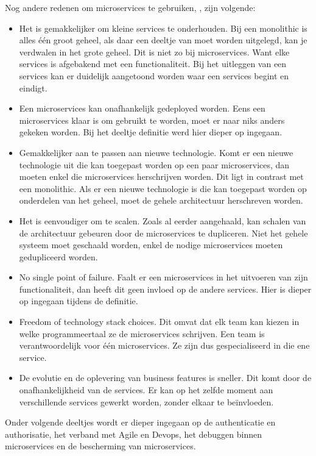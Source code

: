 Nog andere redenen om microservices te gebruiken, \textcite{Koukia2018}, zijn volgende:
\begin{itemize}
	\item Het is gemakkelijker om kleine services te onderhouden. Bij een monolithic is alles één groot geheel, als daar een deeltje van moet worden uitgelegd, kan je verdwalen in het grote geheel. Dit is niet zo bij microservices. Want elke services is afgebakend met een functionaliteit. Bij het uitleggen van een services kan er duidelijk aangetoond worden waar een services begint en eindigt. 
	\item Een microservices kan onafhankelijk gedeployed worden. Eens een microservices klaar is om gebruikt te worden, moet er naar niks anders gekeken worden. Bij het deeltje definitie werd hier dieper op ingegaan.
	\item Gemakkelijker aan te passen aan nieuwe technologie. Komt er een nieuwe technologie uit die kan toegepast worden op een paar microservices, dan moeten enkel die microservices herschrijven worden. Dit ligt in contrast met een monolithic. Als er een nieuwe technologie is die kan toegepast worden op onderdelen van het geheel, moet de gehele architectuur herschreven worden.
	\item Het is eenvoudiger om te scalen. Zoals al eerder aangehaald, kan schalen van de architectuur gebeuren door de microservices te dupliceren. Niet het gehele systeem moet geschaald worden, enkel de nodige microservices moeten gedupliceerd worden. 
	\item No single point of failure. Faalt er een microservices in het uitvoeren van zijn functionaliteit, dan heeft dit geen invloed op de andere services. Hier is dieper op ingegaan tijdens de definitie.
	\item Freedom of technology stack choices. Dit omvat dat elk team kan kiezen in welke programmeertaal ze de microservices schrijven. Een team is verantwoordelijk voor één microservices. Ze zijn dus gespecialiseerd in die ene service. 
	\item De evolutie en de oplevering van business features is sneller. Dit komt door de onafhankelijkheid van de services. Er kan op het zelfde moment aan verschillende services gewerkt worden, zonder elkaar te beïnvloeden.
\end{itemize}


Onder volgende deeltjes wordt er dieper ingegaan op de authenticatie en authorisatie, het verband met Agile en Devops, het debuggen binnen microservices en de bescherming van microservices.


